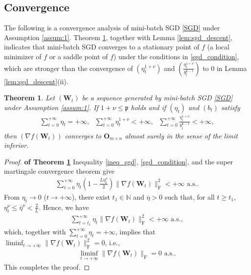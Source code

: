 \documentclass[twoside,11pt]{article}
\newtheorem{thm}{Theorem}[section]
\begin{document}
\subsection{Convergence}
The following is a convergence analysis of mini-batch SGD \eqref{SGD} under Assumption \ref{assum:1}. Theorem \ref{thm:sgd_convergence}, together with Lemma \ref{lem:sgd_descent}, indicates that mini-batch SGD converges to a stationary point of $f$ (a local minimizer of $f$ or a saddle point of $f$) under the conditions in \eqref{sgd_condition}, which are stronger than the convergence of $(\eta_t^{1 + \nu})$ and $(\frac{\eta_t^{1 + \nu}}{b_t^{\mathfrak{p}-1}})$ to $0$ in Lemma \ref{lem:sgd_descent}(ii).

\begin{thm}\label{thm:sgd_convergence}
Let $(\bm{W}_t)$ be a sequence generated by mini-batch SGD \eqref{SGD} under Assumption \ref{assum:1}. If $1 + \nu \leq \mathfrak{p}$ holds and if $(\eta_t)$ and $(b_t)$ satisfy 
\begin{align}\label{sgd_condition}
\sum_{t=0}^{+\infty} \eta_t = + \infty, \text{ }
\sum_{t=0}^{+\infty} \eta_t^{1 + \nu} < + \infty, \text{ } 
\sum_{t=0}^{+\infty} \frac{\eta_t^{1 + \nu}}{b_t^{\mathfrak{p} - 1}} < + \infty,
\end{align}
then $(\nabla f (\bm{W}_t))$ converges to $\bm{O}_{m \times n}$ almost surely in the sense of the limit inferior. 
\end{thm}

\begin{proof}
\textbf{of Theorem \ref{thm:sgd_convergence}} Inequality \eqref{ineq_sgd}, \eqref{sgd_condition}, and the super martingale convergence theorem \citep[Proposition 8.2.10]{bert}  give
\begin{align*}
\sum_{t=0}^{+ \infty} \eta_t \left( 1 - \frac{L \eta_t^\nu}{2}   \right) \| \nabla f (\bm{W}_t)\|_{\mathrm{F}}^2 < + \infty \text{ a.s.}.
\end{align*}
From $\eta_t \to 0$ ($t \to + \infty$), there exist $t_1 \in \mathbb{N}$ and $\overline{\eta} > 0$ such that, for all $t \geq t_1$, $\eta_t^\nu \leq \overline{\eta}^\nu < \frac{2}{L}$. Hence, we have 
\begin{align*}
\sum_{t= t_1}^{+ \infty} \eta_t \| \nabla f (\bm{W}_t)\|_{\mathrm{F}}^2 < + \infty \text{ a.s.},
\end{align*}
which, together with $\sum_{t=0}^{+ \infty} \eta_t = + \infty$, implies that $\liminf_{t \to + \infty} \| \nabla f (\bm{W}_t)\|_{\mathrm{F}}^2 = 0$, i.e., 
\begin{align*}
\liminf_{t \to + \infty} \| \nabla f (\bm{W}_t)\|_{\mathrm{F}} = 0 \text{ a.s.}.
\end{align*}
This completes the proof.
\end{proof}
\end{document}
